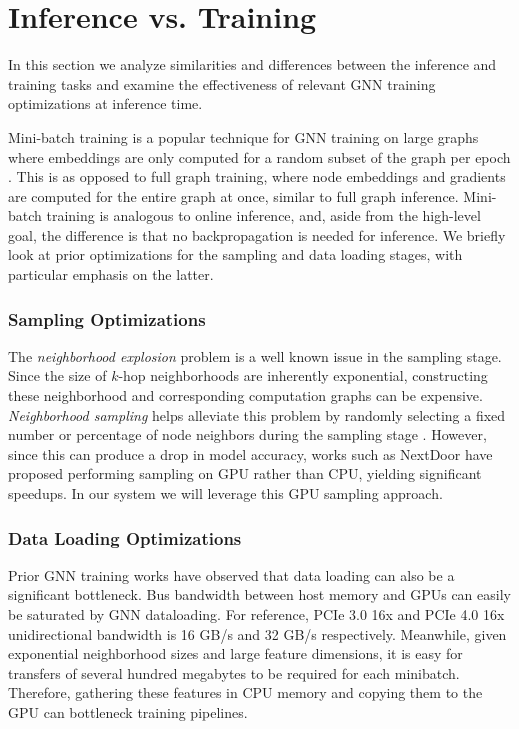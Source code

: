 \section{Inference vs. Training} \label{Background: Relation to training}
In this section we analyze similarities and differences between the inference and training tasks and examine the effectiveness of relevant GNN training optimizations at inference time.

Mini-batch training is a popular technique for GNN training on large graphs where embeddings are only computed for a random subset of the graph per epoch \cite{BGL_2023}. 
This is as opposed to full graph training, where node embeddings and gradients are computed for the entire graph at once, similar to full graph inference.
Mini-batch training is analogous to online inference, and, aside from the high-level goal, the difference is that no backpropagation is needed for inference. We briefly look at prior optimizations for the sampling and data loading stages, with particular emphasis on the latter.

\subsubsection{Sampling Optimizations}
The \textit{neighborhood explosion} problem is a well known issue in the sampling stage.
Since the size of $k$-hop neighborhoods are inherently exponential, constructing these neighborhood and corresponding computation graphs can be expensive. \textit{Neighborhood sampling} helps alleviate this problem by randomly selecting a fixed number or percentage of node neighbors during the sampling stage \cite{GraphSAGE_2017}. 
However, since this can produce a drop in model accuracy, works such as NextDoor \cite{NextDoor_2021} have proposed performing sampling on GPU rather than CPU, yielding significant speedups.
In our system we will leverage this GPU sampling approach.

\subsubsection{Data Loading Optimizations}

Prior GNN training works have observed that data loading can also be a significant bottleneck.
Bus bandwidth between host memory and GPUs can easily be saturated by GNN dataloading. 
For reference, PCIe 3.0 16x and PCIe 4.0 16x unidirectional bandwidth is 16 GB/s and 32 GB/s respectively.
Meanwhile, given exponential neighborhood sizes and large feature dimensions, it is easy for transfers of several hundred megabytes to be required for each minibatch.
Therefore, gathering these features in CPU memory and copying them to the GPU can bottleneck training pipelines.

